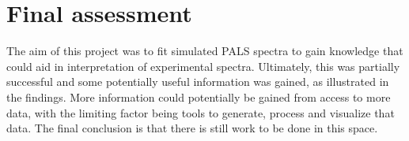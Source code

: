\section{Final assessment}

The aim of this project was to fit simulated PALS spectra to gain knowledge that could aid in interpretation of experimental spectra. Ultimately, this was partially successful and some potentially useful information was gained, as illustrated in the findings. More information could potentially be gained from access to more data, with the limiting factor being tools to generate, process and visualize that data. The final conclusion is that there is still work to be done in this space.